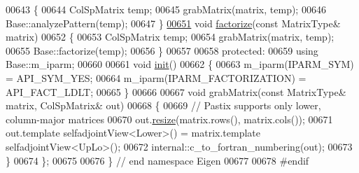 \begin{DoxyCode}
00643     \{ 
00644       ColSpMatrix temp;
00645       grabMatrix(matrix, temp);
00646       Base::analyzePattern(temp);
00647     \}
\hyperlink{class_eigen_1_1_pastix_l_d_l_t_a182b0ee676a131413363cc73bc309ef7}{00651}     \textcolor{keywordtype}{void} \hyperlink{class_eigen_1_1_pastix_l_d_l_t_a182b0ee676a131413363cc73bc309ef7}{factorize}(\textcolor{keyword}{const} MatrixType& matrix)
00652     \{
00653       ColSpMatrix temp;
00654       grabMatrix(matrix, temp);
00655       Base::factorize(temp);
00656     \}
00657 
00658   \textcolor{keyword}{protected}:
00659     \textcolor{keyword}{using} Base::m\_iparm;
00660     
00661     \textcolor{keywordtype}{void} \hyperlink{structinit}{init}()
00662     \{
00663       m\_iparm(IPARM\_SYM) = API\_SYM\_YES;
00664       m\_iparm(IPARM\_FACTORIZATION) = API\_FACT\_LDLT;
00665     \}
00666     
00667     \textcolor{keywordtype}{void} grabMatrix(\textcolor{keyword}{const} MatrixType& matrix, ColSpMatrix& out)
00668     \{
00669       \textcolor{comment}{// Pastix supports only lower, column-major matrices }
00670       out.\hyperlink{group___sparse_core___module_af88551f30202341b7cc24cfadabdec5c}{resize}(matrix.rows(), matrix.cols());
00671       out.template selfadjointView<Lower>() = matrix.template selfadjointView<UpLo>();
00672       internal::c\_to\_fortran\_numbering(out);
00673     \}
00674 \};
00675 
00676 \} \textcolor{comment}{// end namespace Eigen}
00677 
00678 \textcolor{preprocessor}{#endif}
\end{DoxyCode}
